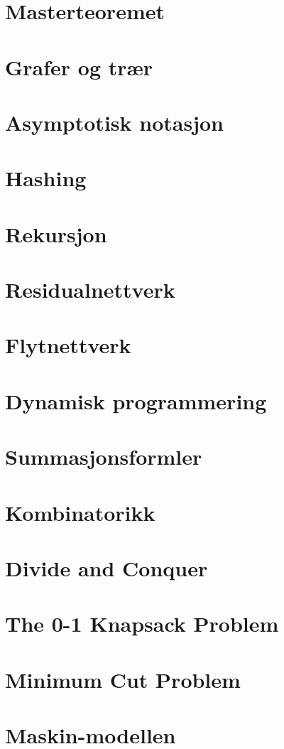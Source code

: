 \documentclass{article}
\begin{document}
\section{Masterteoremet}
\section{Grafer og trær}
\section{Asymptotisk notasjon}
\section{Hashing}
\section{Rekursjon}
\section{Residualnettverk}
\section{Flytnettverk}
\section{Dynamisk programmering}
\section{Summasjonsformler}
\section{Kombinatorikk}

\section{Divide and Conquer}
\section{The 0-1 Knapsack Problem}
\section{Minimum Cut Problem}
\section{Maskin-modellen}
\end{document}
